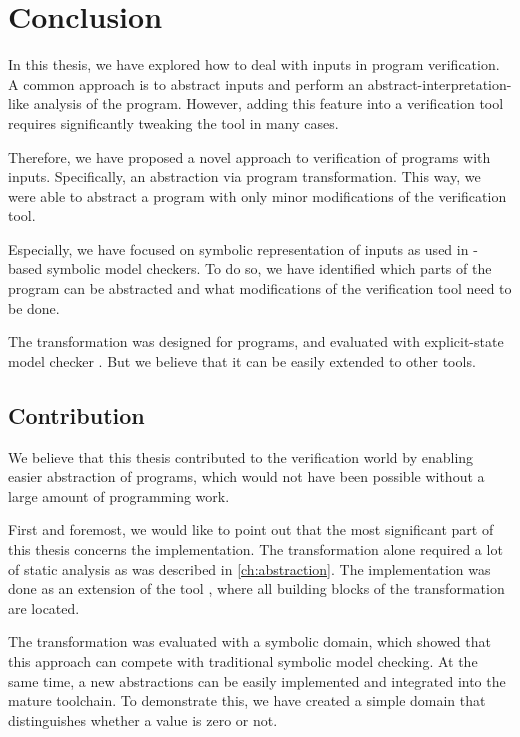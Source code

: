 \chapter{Conclusion}\label{ch:conclusion}

In this thesis, we have explored how to deal with inputs in program
verification. A common approach is to abstract inputs and perform an
abstract-interpretation-like analysis of the program. However, adding this feature into a
verification tool requires significantly tweaking the tool in many cases.

Therefore, we have proposed a novel approach to verification of programs with
inputs. Specifically, an abstraction via program transformation. This way, we
were able to abstract a program with only minor modifications of the verification
tool.

Especially, we have focused on symbolic representation of inputs as used in \SMT-based
symbolic model checkers. To do so, we have identified which parts of the program can be
abstracted and what modifications of the verification tool need to be done.

The transformation was designed for \LLVM{} programs, and evaluated with
explicit-state model checker \DIVINE. But we believe that it can be easily extended
to other tools.

\section{Contribution}
We believe that this thesis contributed to the verification world by enabling
easier abstraction of programs, which would not have been possible without a
large amount of programming work.


First and foremost, we would like to point out that the most significant part of
this thesis concerns the implementation. The transformation alone required
a lot of static analysis as was described in \autoref{ch:abstraction}. The
implementation was done as an extension of the tool \LART, where all building
blocks of the transformation are located.

The transformation was evaluated with a symbolic domain,
which showed that this approach can compete with traditional symbolic model
checking. At the same time, a new abstractions can be easily implemented and
integrated into the mature \DIVINE toolchain. To demonstrate this, we have created a
simple domain that distinguishes whether a value is zero or not.


